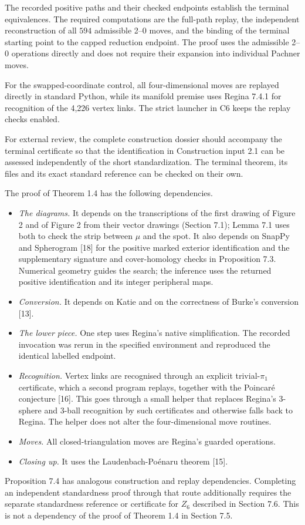 \documentclass[11pt,letterpaper]{article}
\begin{document}
The recorded positive paths and their checked endpoints establish the terminal equivalences. The required computations are the full-path replay, the independent reconstruction of all $594$ admissible 2--0 moves, and the binding of the terminal starting point to the capped reduction endpoint. The proof uses the admissible 2--0 operations directly and does not require their expansion into individual Pachner moves.

For the swapped-coordinate control, all four-dimensional moves are replayed directly in standard Python, while its manifold premise uses Regina 7.4.1 for recognition of the 4,226 vertex links. The strict launcher in C6 keeps the replay checks enabled.

For external review, the complete construction dossier should accompany the terminal certificate so that the identification in Construction input 2.1 can be assessed independently of the short standardization. The terminal theorem, its files and its exact standard reference can be checked on their own.

The proof of Theorem 1.4 has the following dependencies.
\begin{itemize}
\item \emph{The diagrams.} It depends on the transcriptions of the first drawing of Figure 2 and of Figure 2 from their vector drawings (Section 7.1); Lemma 7.1 uses both to check the strip between $\mu$ and the spot. It also depends on SnapPy and Spherogram [18] for the positive marked exterior identification and the supplementary signature and cover-homology checks in Proposition 7.3. Numerical geometry guides the search; the inference uses the returned positive identification and its integer peripheral maps.
\item \emph{Conversion.} It depends on Katie and on the correctness of Burke's conversion [13].
\item \emph{The lower piece.} One step uses Regina's native simplification. The recorded invocation was rerun in the specified environment and reproduced the identical labelled endpoint.
\item \emph{Recognition.} Vertex links are recognised through an explicit trivial-$\pi_1$ certificate, which a second program replays, together with the Poincaré conjecture [16]. This goes through a small helper that replaces Regina's 3-sphere and 3-ball recognition by such certificates and otherwise falls back to Regina. The helper does not alter the four-dimensional move routines.
\item \emph{Moves.} All closed-triangulation moves are Regina's guarded operations.
\item \emph{Closing up.} It uses the Laudenbach-Poénaru theorem [15].
\end{itemize}
Proposition 7.4 has analogous construction and replay dependencies. Completing an independent standardness proof through that route additionally requires the separate standardness reference or certificate for $Z_6$ described in Section 7.6. This is not a dependency of the proof of Theorem 1.4 in Section 7.5.
\end{document}
